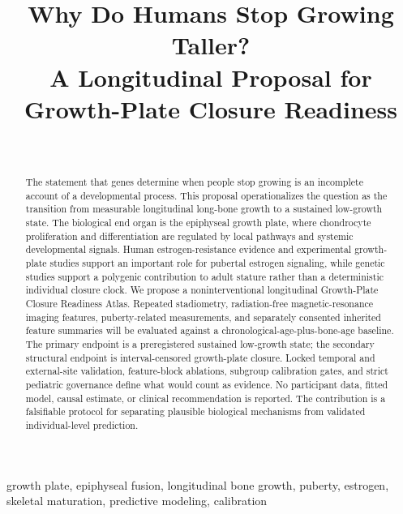 \documentclass[conference]{IEEEtran}
\begin{document}
\title{Why Do Humans Stop Growing Taller?\\
A Longitudinal Proposal for Growth-Plate Closure Readiness}

\author{\\
}

\maketitle

\begin{abstract}
The statement that genes determine when people stop growing is an incomplete account of a developmental process. This proposal operationalizes the question as the transition from measurable longitudinal long-bone growth to a sustained low-growth state. The biological end organ is the epiphyseal growth plate, where chondrocyte proliferation and differentiation are regulated by local pathways and systemic developmental signals. Human estrogen-resistance evidence and experimental growth-plate studies support an important role for pubertal estrogen signaling, while genetic studies support a polygenic contribution to adult stature rather than a deterministic individual closure clock. We propose a noninterventional longitudinal Growth-Plate Closure Readiness Atlas. Repeated stadiometry, radiation-free magnetic-resonance imaging features, puberty-related measurements, and separately consented inherited feature summaries will be evaluated against a chronological-age-plus-bone-age baseline. The primary endpoint is a preregistered sustained low-growth state; the secondary structural endpoint is interval-censored growth-plate closure. Locked temporal and external-site validation, feature-block ablations, subgroup calibration gates, and strict pediatric governance define what would count as evidence. No participant data, fitted model, causal estimate, or clinical recommendation is reported. The contribution is a falsifiable protocol for separating plausible biological mechanisms from validated individual-level prediction.
\end{abstract}

\begin{IEEEkeywords}
growth plate, epiphyseal fusion, longitudinal bone growth, puberty, estrogen, skeletal maturation, predictive modeling, calibration
\end{IEEEkeywords}
\end{document}
